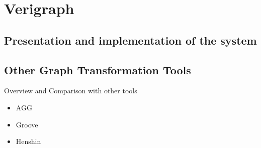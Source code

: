 \chapter{Verigraph}

\section{Presentation and implementation of the system}

\section{Other Graph Transformation Tools}

Overview and Comparison with other tools

\begin{itemize}
\item AGG
\item Groove
\item Henshin
\end{itemize}
